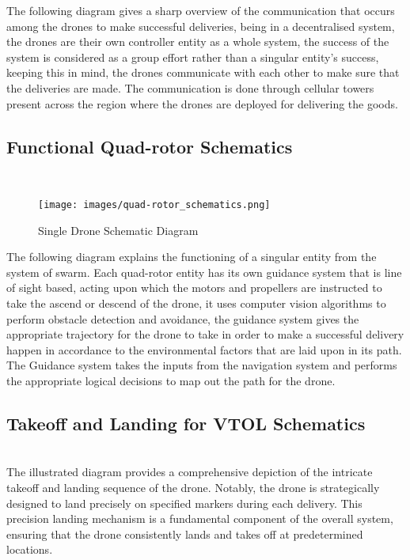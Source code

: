 \documentclass[preprint,12pt]{elsarticle}
\begin{document}
The following diagram gives a sharp overview of the communication that occurs among the drones to make successful deliveries, being in a decentralised system, the drones are their own controller entity as a whole system, the success of the system is considered as a group effort rather than a singular entity’s success, keeping this in mind, the drones communicate with each other to make sure that the deliveries are made. The communication is done through cellular towers present across the region where the drones are deployed for delivering the goods.\\

\subsection{Functional Quad-rotor Schematics}\\

\begin{figure}[!htbp]
    \centering
    \texttt{[image: images/quad-rotor\_schematics.png]}
    \caption{Single Drone Schematic Diagram}
\end{figure}

The following diagram explains the functioning of a singular entity from the system of swarm. Each quad-rotor entity has its own guidance system that is line of sight based, acting upon which the motors and propellers are instructed to take the ascend or descend of the drone, it uses computer vision algorithms to perform obstacle detection and avoidance, the guidance system gives the appropriate trajectory for the drone to take in order to make a successful delivery happen in accordance to the environmental factors that are laid upon in its path. The Guidance system takes the inputs from the navigation system and performs the appropriate logical decisions to map out the path for the drone.\\

\subsection{Takeoff and Landing for VTOL Schematics}\\
The illustrated diagram provides a comprehensive depiction of the intricate takeoff and landing sequence of the drone. Notably, the drone is strategically designed to land precisely on specified markers during each delivery. This precision landing mechanism is a fundamental component of the overall system, ensuring that the drone consistently lands and takes off at predetermined locations.
\end{document}
